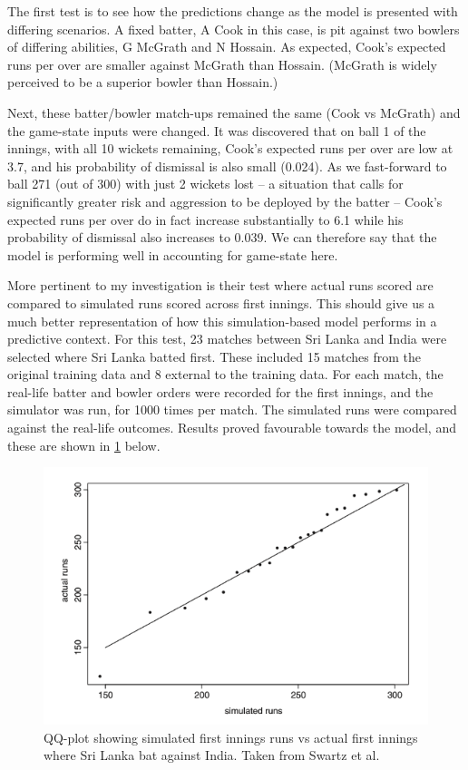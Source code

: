 The first test is to see how the predictions change as the model is presented with differing scenarios. A fixed batter, A Cook in this case, is pit against two bowlers of differing abilities, G McGrath and N Hossain. As expected, Cook’s expected runs per over are smaller against McGrath than Hossain. (McGrath is widely perceived to be a superior bowler than Hossain.)

Next, these batter/bowler match-ups remained the same (Cook vs McGrath) and the game-state inputs were changed. It was discovered that on ball 1 of the innings, with all 10 wickets remaining, Cook’s expected runs per over are low at 3.7, and his probability of dismissal is also small (0.024). As we fast-forward to ball 271 (out of 300) with just 2 wickets lost – a situation that calls for significantly greater risk and aggression to be deployed by the batter – Cook’s expected runs per over do in fact increase substantially to 6.1 while his probability of dismissal also increases to 0.039. We can therefore say that the model is performing well in accounting for game-state here.

More pertinent to my investigation is their test where actual runs scored are compared to simulated runs scored across first innings. This should give us a much better representation of how this simulation-based model performs in a predictive context. For this test, 23 matches between Sri Lanka and India were selected where Sri Lanka batted first. These included 15 matches from the original training data and 8 external to the training data.  For each match, the real-life batter and bowler orders were recorded for the first innings, and the simulator was run, for 1000 times per match. The simulated runs were compared against the real-life outcomes. Results proved favourable towards the model, and these are shown in \cref{fig:swartz3} below.

\begin{figure}[h]
    \centering
    \includegraphics{images/swartz3.png}
    \caption{QQ-plot showing simulated first innings runs vs actual first innings where Sri Lanka bat against India. Taken from Swartz et al.}
    \label{fig:swartz3}
\end{figure}

